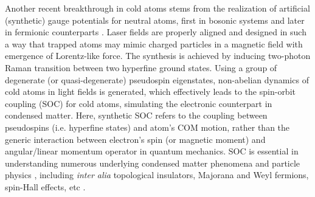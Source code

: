 \documentclass[atoms,article,submit,moreauthors,pdftex,12pt,a4paper]{mdpi}
\begin{document}
Another recent breakthrough in cold atoms stems from the realization of artificial (synthetic) gauge potentials for neutral atoms, first in bosonic systems \cite{soc1, soc2} and later in fermionic counterparts \cite{soc3, soc4}. Laser fields are properly aligned and designed in such a way that trapped atoms may mimic charged particles in a magnetic field with emergence of Lorentz-like force. The synthesis is achieved by inducing two-photon Raman transition between two hyperfine ground states. Using a group of degenerate (or quasi-degenerate) pseudospin eigenstates, non-abelian dynamics of cold atoms in light fields is generated, which effectively leads to the spin-orbit coupling (SOC) for cold atoms, simulating the  electronic counterpart in condensed matter. Here, synthetic SOC refers to the coupling between pseudospins (i.e. hyperfine states) and atom's COM motion, rather than the generic interaction between electron's spin (or magnetic moment) and angular/linear momentum operator in quantum mechanics. SOC is essential in understanding numerous underlying condensed matter phenomena and particle physics \cite{socVictor}, including {\em inter alia} topological insulators, Majorana and Weyl fermions, spin-Hall effects, etc \cite{TI, MF, WF, SHE1, SHE2}. 
\end{document}

